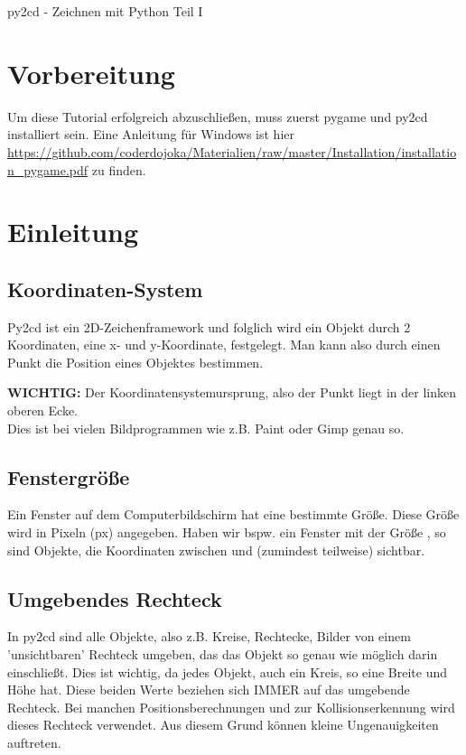 \documentclass{\VorlagenPfad/coderdojokatext}
\newcommand{\Titel}{py2cd - Zeichnen mit Python Teil I}
\begin{document}
\begin{center}
	{\huge \Titel}
\end{center}

\section{Vorbereitung}
Um diese Tutorial erfolgreich abzuschließen, muss zuerst pygame und py2cd installiert sein. Eine Anleitung für Windows ist hier \url{https://github.com/coderdojoka/Materialien/raw/master/Installation/installation_pygame.pdf} zu finden.

\section{Einleitung}

\subsection{Koordinaten-System}
Py2cd ist ein 2D-Zeichenframework und folglich wird ein Objekt durch 2 Koordinaten, eine x- und y-Koordinate, festgelegt. Man kann also durch einen Punkt  die Position eines Objektes bestimmen.
\begin{merkbox}
\textbf{WICHTIG:} Der Koordinatensystemursprung, also der Punkt  liegt in der linken oberen Ecke.
\\Dies ist bei vielen Bildprogrammen wie z.B. Paint oder Gimp genau so.
\end{merkbox}

\subsection{Fenstergröße}
Ein Fenster auf dem Computerbildschirm hat eine bestimmte Größe. Diese Größe wird in Pixeln (px) angegeben. Haben wir bspw. ein Fenster mit der Größe ,
so sind Objekte, die Koordinaten zwischen  und  (zumindest teilweise) sichtbar.

\subsection{Umgebendes Rechteck}
In py2cd sind alle Objekte, also z.B. Kreise, Rechtecke, Bilder von einem 'unsichtbaren' Rechteck umgeben, das das Objekt so genau wie möglich darin einschließt. Dies ist wichtig, da jedes Objekt, auch ein Kreis, so eine Breite und Höhe hat. Diese beiden Werte beziehen sich IMMER auf das umgebende Rechteck. Bei manchen Positionsberechnungen und zur Kollisionserkennung wird dieses Rechteck verwendet. Aus diesem Grund können kleine Ungenauigkeiten auftreten. 
\end{document}
